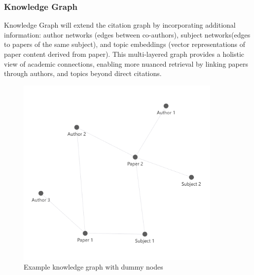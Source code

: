 \documentclass[a4paper,12pt]{article}
\begin{document}
\subsubsection{Knowledge Graph}
Knowledge Graph will extend the citation graph by incorporating additional
information: author networks (edges between co-authors), subject networks(edges
to papers of the same subject), and topic embeddings (vector representations of
paper content derived from paper). This multi-layered graph provides a holistic
view of academic connections, enabling more nuanced retrieval by linking papers
through authors, and topics beyond direct citations.
\begin{figure}[H]
    \centering
    \includegraphics[width=10cm]{knowledgegraph.png}
    \caption{Example knowledge graph with dummy nodes}
\end{figure}
\end{document}
